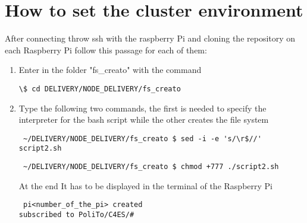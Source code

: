  \section{How to set the cluster environment}
After connecting throw ssh with the raspberry Pi and cloning the repository on each Raspberry Pi follow this passage for each of them:
\begin{enumerate}
\item Enter in the folder "fs\_creato" with the command  \begin{verbatim}\$ cd DELIVERY/NODE_DELIVERY/fs_creato\end{verbatim} 
\item Type the following two commands, the first is needed to specify the interpreter for the bash script while the other creates the file system \begin{verbatim} ~/DELIVERY/NODE_DELIVERY/fs_creato $ sed -i -e 's/\r$//' script2.sh  \end{verbatim}
\begin{verbatim} ~/DELIVERY/NODE_DELIVERY/fs_creato $ chmod +777 ./script2.sh \end{verbatim}  
At the end It has to be displayed in the terminal of the Raspberry Pi \begin{verbatim} pi<number_of_the_pi> created
subscribed to PoliTo/C4ES/# \end{verbatim}  
\end{enumerate}
